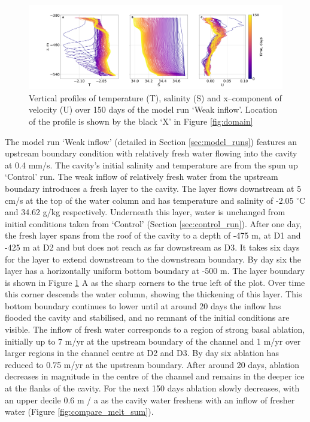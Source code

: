 \begin{figure}[!ht]
\centering
\includegraphics[width=1\textwidth]{chapters/4/weak_inflow_TSU.png}
\caption[Weak inflow (T,S,U)]{Vertical profiles of temperature (T), salinity (S) and x--component of velocity (U) over 150 days of the model run `Weak inflow'. Location of the profile is shown by the black `X' in Figure \ref{fig:domain}}
\label{fig:weak_inflow_TSU}
\end{figure}

The model run `Weak inflow' (detailed in Section \ref{sec:model_runs}) features an upstream boundary condition with relatively fresh water flowing into the cavity at 0.4 mm/s. The cavity's initial salinity and temperature are from the spun up `Control' run.
The weak inflow of relatively fresh water from the upstream boundary introduces a fresh layer to the cavity. The layer flows downstream at 5 cm/s at the top of the water column and has temperature and salinity of -2.05 $^{\circ}$C and 34.62 g/kg respectively. Underneath this layer, water is unchanged from initial conditions taken from `Control' (Section \ref{sec:control_run}). After one day, the fresh layer spans from the roof of the cavity to a depth of -475 m, at D1 and -425 m at D2 and but does not reach as far downstream as D3. It takes six days for the layer to extend downstream to the downstream boundary. By day six the layer has a horizontally uniform bottom boundary at -500 m. The layer boundary is shown in Figure \ref{fig:weak_inflow_TSU} A as the sharp corners to the true left of the plot. Over time this corner descends the water column, showing the thickening of this layer.  This bottom boundary continues to lower until at around 20 days the inflow has flooded the cavity and stabilised, and no remnant of the initial conditions are visible.  
The inflow of fresh water corresponds to a region of strong basal ablation, initially up to 7 m/yr at the upstream boundary of the channel and 1 m/yr over larger regions in the channel centre at D2 and D3. By day six ablation has reduced to 0.75 m/yr at the upstream boundary. After around 20 days, ablation decreases in magnitude in the centre of the channel and remains in the deeper ice at the flanks of the cavity. For the next 150 days ablation slowly decreases, with an upper decile 0.6 m / a as the cavity water freshens with an inflow of fresher water (Figure \ref{fig:compare_melt_sum}). 

